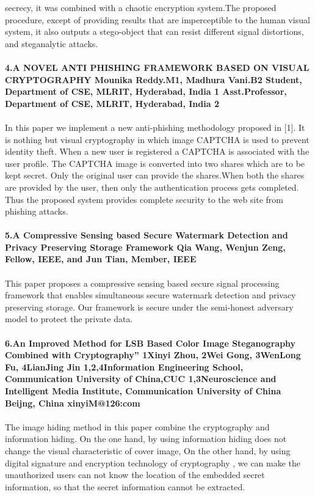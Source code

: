 \documentclass[12pt]{extreport}
\begin{document}
secrecy, it was combined with a chaotic encryption system.The proposed procedure, except of providing results that are imperceptible to the human visual system, it also outputs a stego-object that can resist different signal distortions, and
steganalytic attacks.\\\\
\textbf{4.A NOVEL ANTI PHISHING FRAMEWORK
BASED ON VISUAL CRYPTOGRAPHY
Mounika Reddy.M1, Madhura Vani.B2
Student, Department of CSE, MLRIT, Hyderabad, India 1
Asst.Professor, Department of CSE, MLRIT, Hyderabad, India 2 }\\\\
In this paper we implement a new anti-phishing methodology proposed in [1]. It is nothing but visual cryptography in which image CAPTCHA is used to prevent identity theft. When a new user is
registered a CAPTCHA is associated with the user profile. The CAPTCHA image is converted into two shares which are to be kept secret. Only the original user can provide the shares.When both the shares are provided by the user, then only the authentication process gets completed. Thus the proposed system provides complete security to the web site from
phishing attacks.\\\\
\noindent
\textbf{5.A Compressive Sensing based Secure Watermark
Detection and Privacy Preserving Storage
Framework
Qia Wang, Wenjun Zeng, Fellow, IEEE, and Jun Tian, Member, IEEE}\\\\
This paper proposes a compressive sensing based secure signal processing framework that enables simultaneous secure watermark detection and privacy preserving storage. Our framework is secure under the semi-honest adversary model to protect the private data.\\\\
\textbf{6.An Improved Method for LSB Based Color Image Steganography Combined
with Cryptography” 1Xinyi Zhou, 2Wei Gong, 3WenLong Fu, 4LianJing Jin 1,2,4Information Engineering School, Communication University of China,CUC 1,3Neuroscience and Intelligent Media Institute, Communication University of China Beijng, China xinyiM@126:com
}\\\\
The image hiding method in this paper combine the cryptography and information hiding. On the one hand, by using information hiding does not change the visual characteristic of cover image, On the other hand, by using digital signature and encryption technology of cryptography , we can make the unauthorized users can not know the location of the embedded secret information, so that the secret information cannot be extracted.\\\\
\end{document}

